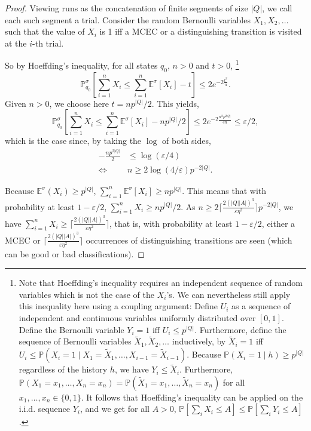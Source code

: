 \documentclass[a4paper,USenglish,cleveref, autoref, thm-restate]{lipics-v2021}
\let\epsilon\varepsilon
\def\abs#1{\ensuremath{\lvert #1 \rvert}}
\newcommand*{\pr}{\mathbb{P}}
\newcommand*{\expect}{\mathbb{E}}
\def\Act{A}
\begin{document}
\begin{proof}
  Viewing runs as the concatenation of finite segments of size $\abs{Q}$, we call each such segment a trial.
  Consider the random Bernoulli variables $X_1,X_2,\ldots$
  such that the value of $X_i$ is 1 iff a MCEC or a distinguishing transition is visited at the $i$-th trial.

  So by Hoeffding's inequality, for all states $q_0$, $n>0$ and $t>0$,
  \footnote{Note that Hoeffding's inequality requires an independent sequence of random variables
  which is not the case of the $X_i$'s. We can nevertheless still apply this inequality 
  here using a coupling argument:
  Define $U_i$ as a sequence of independent and continuous variables uniformly distributed over $[0,1]$.
  Define the Bernoulli variable $Y_i=1$ iff $U_i \leq p^{\abs{Q}}$. Furthermore, 
  define the sequence of Bernoulli variables $\tilde{X}_1,\tilde{X}_2,\ldots$ inductively, by
  $\tilde{X}_i=1$ iff $U_i \leq \pr(X_i=1 \mid X_1=\tilde{X}_1,\ldots, X_{i-1}=\tilde{X}_{i-1})$.
  Because $\pr(X_i=1 \mid h)\geq p^{\abs{Q}}$
  regardless of the history $h$, we have $Y_i \leq \tilde{X}_i$.
  Furthermore, $\pr(X_1=x_1, \ldots,X_n=x_n) = \pr(\tilde{X}_1=x_1, \ldots, \tilde{X}_n=x_n)$
  for all $x_1,\ldots,x_n \in \{0,1\}$. It follows that Hoeffding's inequality can be applied on
  the i.i.d. sequence $Y_i$, and we get for all $A>0$, $\pr[\sum_i X_i \leq A] \leq \pr[\sum_i Y_i \leq A]$.
  }
  \[
    \pr_{q_0}^\sigma\left[\sum_{i=1}^n X_i \leq \sum_{i=1}^n \expect^\sigma[X_i]  - t \right]\leq 2e^{-2\frac{t^2}{n}}.
  \]
  Given $n>0$, we  choose here $t = np^{\abs{Q}}/2$. 
  This yields,
  \[
    \pr_{q_0}^\sigma\left[\sum_{i=1}^n X_i \leq \sum_{i=1}^n \expect^\sigma[X_i]  - np^{\abs{Q}}/2 \right]\leq 2e^{-2\frac{n^2p^{2\abs{Q}}}{4n}} \leq \epsilon/2,
  \]
  which is the case since, by taking the $\log$ of both sides,
  \begin{align*}
    -\frac{np^{2\abs{Q}}}{2} &\leq \log(\epsilon/4)\\
    \Leftrightarrow&n \geq 2\log(4/\epsilon)p^{-2\abs{Q}}.
  \end{align*}

  Because $\expect^\sigma(X_i) \geq p^{\abs{Q}}$,
  $\sum_{i=1}^n \expect^\sigma[X_i]\geq np^{\abs{Q}}$. 
  This means that with probability at least $1-\epsilon/2$, 
  $\sum_{i=1}^n X_i\geq np^{\abs{Q}}/2$.
  As $n\geq 2  \lceil \frac{2(\abs{Q}\abs{\Act})^3}{\epsilon\eta^2} \rceil p^{-2\abs{Q}}$,
  we have $\sum_{i=1}^n X_i\geq\lceil\frac{2(\abs{Q}\abs{\Act})^3}{\epsilon\eta^2}\rceil$,
  that is, 
  with probability at least $1-\epsilon/2$, 
  either a MCEC or $\lceil\frac{2(\abs{Q}\abs{\Act})^3}{\epsilon\eta^2} \rceil$ occurrences of distinguishing transitions are seen
  (which can be good or bad classifications).


\end{proof}
\end{document}
